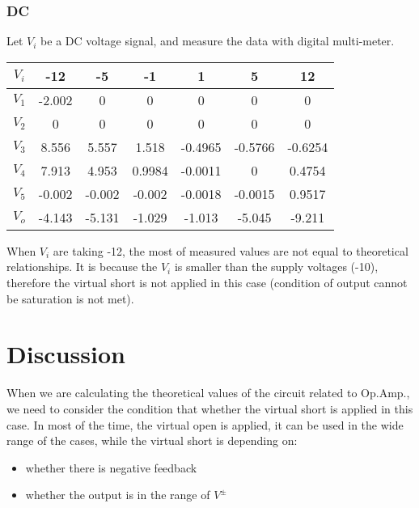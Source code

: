     \subsubsection{DC}
    Let $V_i$ be a DC voltage signal, and measure the data with digital multi-meter.\\
        \begin{table}[h]
        \centering
            \begin{tabular}{|c|c|c|c|c|c|c|}
            \hline
            $V_i$ & -12    & -5     & -1     & 1       & 5       & 12      \\ \hline
            $V_1$ & -2.002 & 0      & 0      & 0       & 0       & 0       \\ \hline
            $V_2$ & 0      & 0      & 0      & 0       & 0       & 0       \\ \hline
            $V_3$ & 8.556  & 5.557  & 1.518  & -0.4965 & -0.5766 & -0.6254 \\ \hline
            $V_4$ & 7.913  & 4.953  & 0.9984 & -0.0011 & 0       & 0.4754  \\ \hline
            $V_5$ & -0.002 & -0.002 & -0.002 & -0.0018 & -0.0015 & 0.9517  \\ \hline
            $V_o$ & -4.143 & -5.131 & -1.029 & -1.013  & -5.045  & -9.211  \\ \hline
        \end{tabular}
        \end{table}
        \FloatBarrier
    When $V_i$ are taking -12, the most of measured values are not equal to theoretical relationships. It is because the $V_i$ is smaller than the supply voltages (-10), therefore the virtual short is not applied in this case (condition of output cannot be saturation is not met).
\section{Discussion}
    When we are calculating the theoretical values of the circuit related to Op.Amp., we need to consider the condition that whether the virtual short is applied in this case. In most of the time, the virtual open is applied, it can be used in the wide range of the cases, while the virtual short is depending on:\\
        \begin{itemize}
            \item whether there is negative feedback
            \item whether the output is in the range of $V^\pm$
        \end{itemize}

